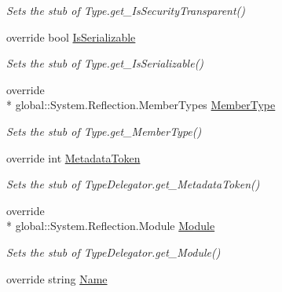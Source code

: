 \begin{DoxyCompactItemize}
\begin{DoxyCompactList}\small\item\em Sets the stub of Type.\-get\-\_\-\-Is\-Security\-Transparent()\end{DoxyCompactList}\item 
override bool \hyperlink{class_system_1_1_reflection_1_1_fakes_1_1_stub_type_delegator_a91d9646fce1cceacebb140a1b7595aea}{Is\-Serializable}
\begin{DoxyCompactList}\small\item\em Sets the stub of Type.\-get\-\_\-\-Is\-Serializable()\end{DoxyCompactList}\item 
override \\*
global\-::\-System.\-Reflection.\-Member\-Types \hyperlink{class_system_1_1_reflection_1_1_fakes_1_1_stub_type_delegator_a710ac251ca27387880d2a4370d748127}{Member\-Type}
\begin{DoxyCompactList}\small\item\em Sets the stub of Type.\-get\-\_\-\-Member\-Type()\end{DoxyCompactList}\item 
override int \hyperlink{class_system_1_1_reflection_1_1_fakes_1_1_stub_type_delegator_af31d06150bec22be8ecb4f6c92f59544}{Metadata\-Token}
\begin{DoxyCompactList}\small\item\em Sets the stub of Type\-Delegator.\-get\-\_\-\-Metadata\-Token()\end{DoxyCompactList}\item 
override \\*
global\-::\-System.\-Reflection.\-Module \hyperlink{class_system_1_1_reflection_1_1_fakes_1_1_stub_type_delegator_a3dc81d01906cb401375b4b110e5aa7a1}{Module}
\begin{DoxyCompactList}\small\item\em Sets the stub of Type\-Delegator.\-get\-\_\-\-Module()\end{DoxyCompactList}\item 
override string \hyperlink{class_system_1_1_reflection_1_1_fakes_1_1_stub_type_delegator_ad42f1c9ef98a88f5ecd153d863185378}{Name}

\end{DoxyCompactItemize}
